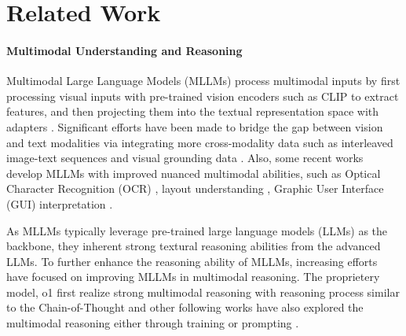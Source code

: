 \section{Related Work}

\paragraph{Multimodal Understanding and Reasoning} 
Multimodal Large Language Models (MLLMs) process multimodal inputs by first processing visual inputs with pre-trained vision encoders such as CLIP \cite{radford2021learning} to extract features, and then projecting them into the textual representation space with adapters \cite{liu2024improved,li2023blip}. Significant efforts have been made to bridge the gap between vision and text modalities via integrating more cross-modality data such as interleaved image-text sequences and visual grounding data \cite{alayrac2022flamingo,chen2023shikra, peng2023kosmos}. Also, some recent works develop MLLMs with improved nuanced multimodal abilities, such as Optical Character Recognition (OCR) \cite{bai2023qwen,liu2024llavanext}, layout understanding \cite{feng2024layoutgpt, fan2024read}, Graphic User Interface (GUI) interpretation \cite{liu2024harnessingwebpageuistextrich, Qwen2.5-VL}.

As MLLMs typically leverage pre-trained large language models (LLMs) as the backbone, they inherent strong textural reasoning abilities from the advanced LLMs\cite{floridi2020gpt,touvron2023llama, bai2023qwen,taori2023stanford,chowdhery2023palm, openai2024gpt4ocard, geminiteam2024geminifamilyhighlycapable}. To further enhance the reasoning ability of MLLMs, increasing efforts have focused on improving MLLMs in multimodal reasoning. The proprietery model, o1 \cite{openai2024gpto1card} first realize strong multimodal reasoning with reasoning process similar to the Chain-of-Thought \cite{chain-of-thought} and other following works have also explored the multimodal reasoning either through training \cite{wu2024v,qi2024cogcom,shao2024visual} or prompting \cite{zhang2023makes,zhang2024prompt,zheng2023ddcot}.
    

